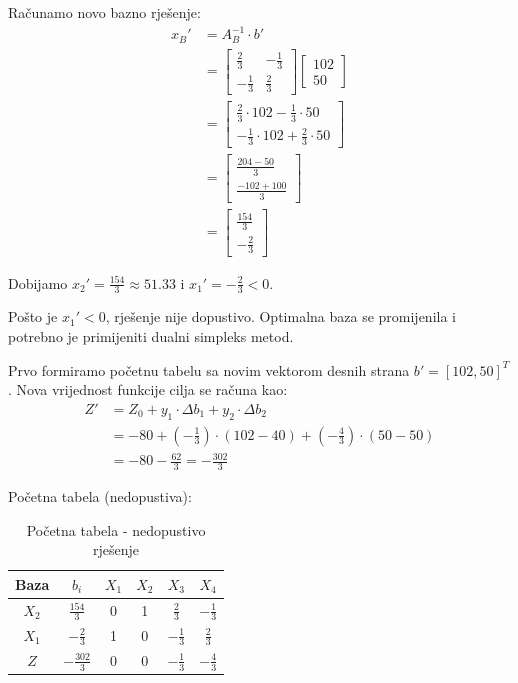 \documentclass[12pt,a4paper]{article}
\begin{document}
Računamo novo bazno rješenje:
\begin{align}
x_B' &= A_B^{-1} \cdot b' \\
&= \begin{bmatrix}
\frac{2}{3} & -\frac{1}{3} \\
-\frac{1}{3} & \frac{2}{3}
\end{bmatrix} \begin{bmatrix} 102 \\ 50 \end{bmatrix} \\
&= \begin{bmatrix}
\frac{2}{3} \cdot 102 - \frac{1}{3} \cdot 50 \\
-\frac{1}{3} \cdot 102 + \frac{2}{3} \cdot 50
\end{bmatrix} \\
&= \begin{bmatrix}
\frac{204 - 50}{3} \\
\frac{-102 + 100}{3}
\end{bmatrix} \\
&= \begin{bmatrix} \frac{154}{3} \\ -\frac{2}{3} \end{bmatrix}
\end{align}

Dobijamo $x_2' = \frac{154}{3} \approx 51.33$ i $x_1' = -\frac{2}{3} < 0$.

Pošto je $x_1' < 0$, rješenje nije dopustivo. Optimalna baza se promijenila i potrebno je primijeniti dualni simpleks metod.

Prvo formiramo početnu tabelu sa novim vektorom desnih strana $b' = [102, 50]^T$. Nova vrijednost funkcije cilja se računa kao:
\begin{align}
Z' &= Z_0 + y_1 \cdot \Delta b_1 + y_2 \cdot \Delta b_2 \\
&= -80 + \left(-\frac{1}{3}\right) \cdot (102 - 40) + \left(-\frac{4}{3}\right) \cdot (50 - 50) \\
&= -80 - \frac{62}{3} = -\frac{302}{3}
\end{align}

Početna tabela (nedopustiva):

\begin{table}[H]
\centering
\begin{tabular}{|c|c|c|c|c|c|}
\hline
Baza & $b_i$ & $X_1$ & $X_2$ & $X_3$ & $X_4$ \\
\hline
$X_2$ & $\frac{154}{3}$ & 0 & 1 & $\frac{2}{3}$ & $-\frac{1}{3}$ \\
\hline
$X_1$ & $-\frac{2}{3}$ & 1 & 0 & $-\frac{1}{3}$ & $\frac{2}{3}$ \\
\hline
$Z$ & $-\frac{302}{3}$ & 0 & 0 & $-\frac{1}{3}$ & $-\frac{4}{3}$ \\
\hline
\end{tabular}
\caption{Početna tabela - nedopustivo rješenje}
\end{table}
\end{document}

